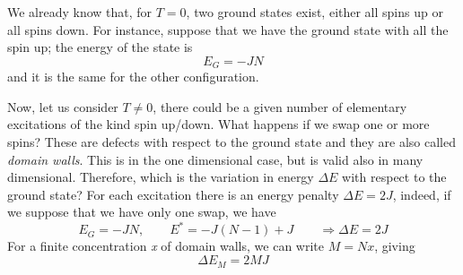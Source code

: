 \documentclass[../main/main.tex]{subfiles}
\begin{document}
We already know that, for \( T=0 \), two ground states exist, either all spins up or all spins down.
For instance, suppose that we have the ground state with all the spin up; the energy of the state is
\begin{equation}
   E_G = -JN
\end{equation}
and it is the same for the other configuration.

Now, let us consider \( T \neq 0 \), there could be a given number of elementary excitations of the kind spin up/down. What happens if we swap one or more spins?
These are defects with respect to the ground state and they are also called \emph{domain walls}.
This is in the one dimensional case, but is valid also in many dimensional. Therefore, which is the variation in energy \( \Delta E \) with respect to the ground state?
For each excitation there is an energy penalty \( \Delta E = 2J \), indeed, if we suppose that we have only one swap, we have 
\begin{equation*}
  E_G = -JN, \qquad E^* = -J(N-1) +J \qquad \Rightarrow \Delta E = 2J
\end{equation*}
For a finite concentration \emph{x} of domain walls, we can write \(   M = Nx \), giving
\begin{equation}
  \Delta E_M = 2MJ
\end{equation}
\end{document}
